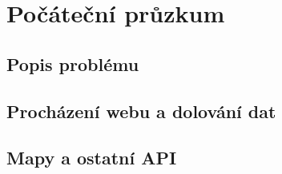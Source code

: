 \chapter{Počáteční průzkum}
\section{Popis problému}

\section{Procházení webu a dolování dat}

\section{Mapy a ostatní API}

\endinput
